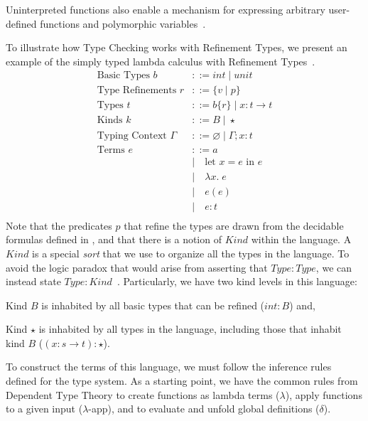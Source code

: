 Uninterpreted functions also enable a mechanism for expressing arbitrary user-defined functions and 
polymorphic variables~\cite{jhala21}.

To illustrate how Type Checking works with Refinement Types, we present an example of the simply typed lambda calculus with Refinement Types~\cite{jhala21}.
\begin{align*}
\text{Basic Types } b &::= int \; | \; unit \\
\text{Type Refinements } r &::= \{v \; | \; p \} \\
\text{Types } t &::= b\{r\} \; | \; x:t \to t \\
\text{Kinds } k &::= B \; | \; \star \\
\text{Typing Context } \Gamma &::= \varnothing \; | \; \Gamma;x:t  \\
\text{Terms } e &::= a \\
  &| \quad \text{let } x = e \text{ in } e \\
  &| \quad \lambda x . \; e \\
  &| \quad e(e) \\
  &| \quad e:t \\
\end{align*}
Note that the predicates $p$ that refine the types are drawn from the decidable formulas defined in 
, and that there is a notion of $Kind$ within the language. A $Kind$ is a special 
\emph{sort} that we use to organize all the types in the language. To avoid the logic paradox that 
would arise from asserting that $Type : Type$, we can instead state $Type : Kind$~\cite{ragde20}.
Particularly, we have two kind levels in this language:
\begin{enumerate*}[label=(\arabic*)]
  \item Kind $B$ is inhabited by all basic types that can be refined (\eg $int : B$) and,
  \item Kind $\star$ is inhabited by all types in the language, including those that inhabit kind $B$ (\eg $(x:s \rightarrow t) : \star$).
\end{enumerate*}

To construct the terms of this language, we must follow the inference rules defined for the type system.
As a starting point, we have the common rules from Dependent Type Theory to create functions as 
lambda terms ($\lambda$), apply functions to a given input ($\lambda$-app), and to evaluate and 
unfold global definitions ($\delta$).

